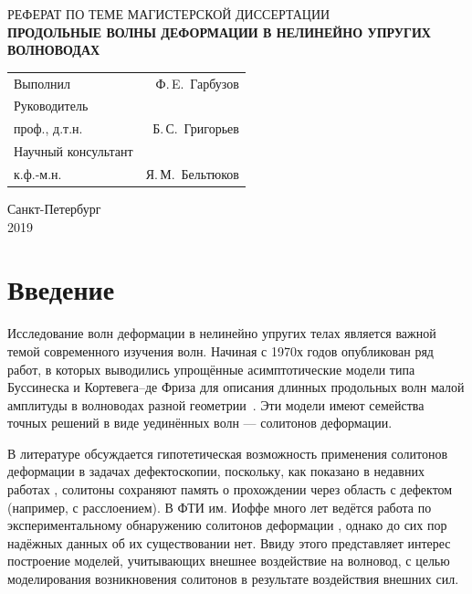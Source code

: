 \documentclass[12pt, a4paper]{article}
\begin{document}
\begin{titlepage}
	
	\begin{center}
		\vspace*{80mm}
		{РЕФЕРАТ ПО ТЕМЕ МАГИСТЕРСКОЙ ДИССЕРТАЦИИ}\\
		\vspace{5mm} 
		{\bf ПРОДОЛЬНЫЕ ВОЛНЫ ДЕФОРМАЦИИ В НЕЛИНЕЙНО УПРУГИХ ВОЛНОВОДАХ}
	\end{center}

	\vspace{30mm}
	\begin{flushleft}
	\begin{tabularx}{\linewidth}{Xr}
		Выполнил & Ф.\,E.~Гарбузов  \\ 
		\vspace{3mm}
		Руководитель &  \\ 
		проф., д.т.н. & Б.\,С.~Григорьев \\ 
		\vspace{3mm}
		Научный консультант  &  \\ 
		к.ф.-м.н. & Я.\,М.~Бельтюков
	\end{tabularx} 
	\end{flushleft}

	
	\vspace{50mm}
	
	\begin{center}
		Санкт-Петербург\\2019
	\end{center}
	
\end{titlepage}



\section{Введение}
\setcounter{page}{2}

Исследование волн деформации в нелинейно упругих телах
является важной темой современного изучения волн.
Начиная с 1970х годов опубликован ряд работ, в которых выводились упрощённые асимптотические модели типа Буссинеска и Кортевега--де Фриза для описания длинных продольных волн малой амплитуды в волноводах разной геометрии~\cite{OS, NS, S_book, P_book, SP, DC, DF, KSZ}. Эти модели имеют семейства точных решений в виде уединённых волн --- солитонов деформации.

В литературе обсуждается гипотетическая возможность применения солитонов деформации в задачах дефектоскопии, поскольку, как показано в недавних работах \cite{KS, KT1, KT2}, солитоны сохраняют память о прохождении через область с дефектом (например, с расслоением). В ФТИ им. Иоффе много лет ведётся работа по экспериментальному обнаружению солитонов деформации \cite{JAP2010, JAP2012}, однако до сих пор надёжных данных об их существовании нет. Ввиду этого представляет интерес построение моделей, учитывающих внешнее воздействие на волновод, с целью моделирования возникновения солитонов в результате воздействия внешних сил. 
\end{document}

